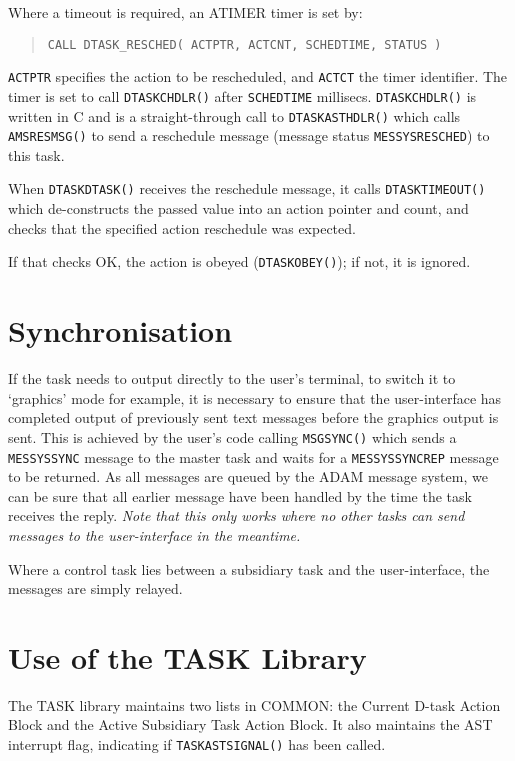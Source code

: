 \documentclass[twoside,11pt]{article}
\newcommand{\xref}[3]{#1}
\renewcommand{\_}{\texttt{\symbol{95}}}
\begin{document}
Where a timeout is required, an ATIMER timer is set by:
\begin{quote} \begin{verbatim}
CALL DTASK_RESCHED( ACTPTR, ACTCNT, SCHEDTIME, STATUS )
\end{verbatim} \end{quote}

\texttt{ACTPTR} specifies the action to be rescheduled, and \texttt{ACTCT}
the timer identifier.
The timer is set to call \texttt{DTASK\_CHDLR()} after \texttt{SCHEDTIME}
millisecs. \texttt{DTASK\_CHDLR()} is written in C and is a straight-through
call to \texttt{DTASK\_ASTHDLR()} which calls \texttt{AMS\_RESMSG()} to
send a reschedule message (message status \texttt{MESSYS\_\_RESCHED}) to this
task.

When \texttt{DTASK\_DTASK()} receives the  reschedule message, it calls
\texttt{DTASK\_TIMEOUT()} which de-constructs the passed value into an action
pointer and count, and checks that the specified action reschedule was
expected.

If that checks OK, the action is obeyed (\texttt{DTASK\_OBEY()}); if not, it is
ignored.

\section{\label{synchronisation}Synchronisation}
If the task needs to output directly to the user's terminal, to switch it to
`graphics' mode for example, it is necessary to ensure that the user-interface
has completed output of previously sent text messages before the graphics
output is sent. This is achieved by the user's code calling
\xref{\texttt{MSG\_SYNC()}}{sun104}{MSG_SYNC}
which sends a \texttt{MESSYS\_SYNC} message to the master task and waits for a
\texttt{MESSYS\_SYNCREP} message to be returned. As all messages are queued by
the ADAM message system, we can be sure that all earlier message have been
handled by the time the task receives the reply. \emph{Note that this only
works where no other tasks can send messages to the user-interface in the
meantime.}

Where a control task lies between a subsidiary task and the user-interface,
the messages are simply relayed.

\section{Use of the TASK Library}
The TASK library maintains two lists in COMMON: the Current D-task Action Block
and the Active Subsidiary Task Action Block.
It also maintains the AST interrupt flag, indicating if
\texttt{TASK\_ASTSIGNAL()} has been called.
\end{document}
